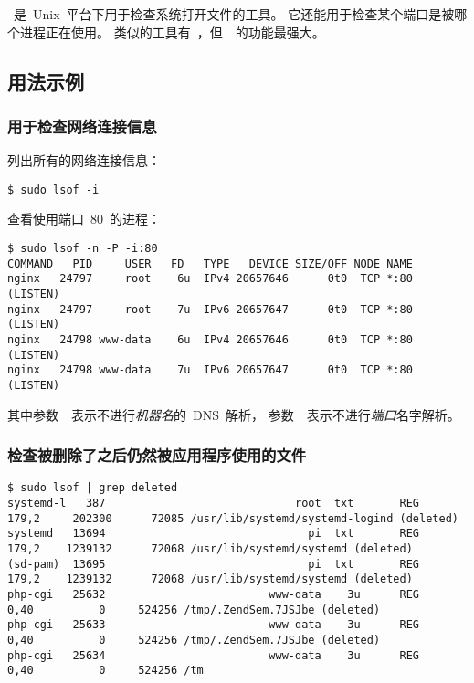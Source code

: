 ~是~Unix~平台下用于检查系统打开文件的工具。
它还能用于检查某个端口是被哪个进程正在使用。
类似的工具有~，但~~的功能最强大。

\subsection{用法示例}

\subsubsection{用于检查网络连接信息}

列出所有的网络连接信息：
\begin{lstlisting}
$ sudo lsof -i
\end{lstlisting}

查看使用端口~80~的进程：
\begin{lstlisting}
$ sudo lsof -n -P -i:80
COMMAND   PID     USER   FD   TYPE   DEVICE SIZE/OFF NODE NAME
nginx   24797     root    6u  IPv4 20657646      0t0  TCP *:80 (LISTEN)
nginx   24797     root    7u  IPv6 20657647      0t0  TCP *:80 (LISTEN)
nginx   24798 www-data    6u  IPv4 20657646      0t0  TCP *:80 (LISTEN)
nginx   24798 www-data    7u  IPv6 20657647      0t0  TCP *:80 (LISTEN)
\end{lstlisting}

其中参数~~表示不进行\emph{机器名}的~DNS~解析，
参数~~表示不进行\emph{端口}名字解析。

\subsubsection{检查被删除了之后仍然被应用程序使用的文件}

\begin{lstlisting}
$ sudo lsof | grep deleted
systemd-l   387                             root  txt       REG      179,2     202300      72085 /usr/lib/systemd/systemd-logind (deleted)
systemd   13694                               pi  txt       REG      179,2    1239132      72068 /usr/lib/systemd/systemd (deleted)
(sd-pam)  13695                               pi  txt       REG      179,2    1239132      72068 /usr/lib/systemd/systemd (deleted)
php-cgi   25632                         www-data    3u      REG       0,40          0     524256 /tmp/.ZendSem.7JSJbe (deleted)
php-cgi   25633                         www-data    3u      REG       0,40          0     524256 /tmp/.ZendSem.7JSJbe (deleted)
php-cgi   25634                         www-data    3u      REG       0,40          0     524256 /tm
\end{lstlisting}
